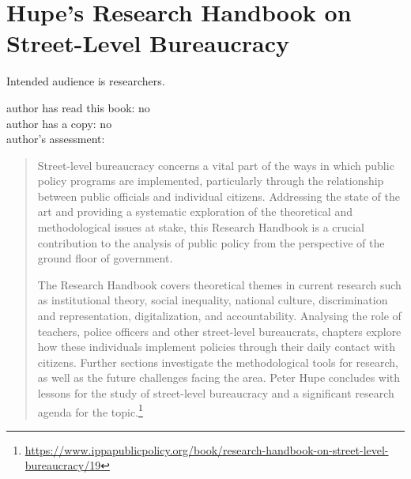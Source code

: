 \section{Hupe's Research Handbook on Street-Level Bureaucracy\label{review:hupe_handbook}}
\cite{2019_Hupe}


Intended audience is researchers.

author has read this book: no\\
author has a copy: no\\
author's assessment:

\begin{quote}
Street-level bureaucracy concerns a vital part of the ways in which public policy programs are implemented, particularly through the relationship between public officials and individual citizens. Addressing the state of the art and providing a systematic exploration of the theoretical and methodological issues at stake, this Research Handbook is a crucial contribution to the analysis of public policy from the perspective of the ground floor of government. 

The Research Handbook covers theoretical themes in current research such as institutional theory, social inequality, national culture, discrimination and representation, digitalization, and accountability. Analysing the role of teachers, police officers and other street-level bureaucrats, chapters explore how these individuals implement policies through their daily contact with citizens. Further sections investigate the methodological tools for research, as well as the future challenges facing the area. Peter Hupe concludes with lessons for the study of street-level bureaucracy and a significant research agenda for the topic.\footnote{\href{https://www.ippapublicpolicy.org/book/research-handbook-on-street-level-bureaucracy/19}{https://www.ippapublicpolicy.org/book/research-handbook-on-street-level-bureaucracy/19}}
\end{quote}